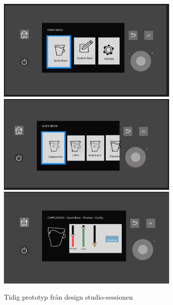 \begin{figure}[H]
    \centering
    \includegraphics[width=0.8\textwidth]{bilder/victor1.png}
    \includegraphics[width=0.8\textwidth]{bilder/victor2.png}
    \includegraphics[width=0.8\textwidth]{bilder/victor3.png}
    \caption{Tidig prototyp från design studio-sessionen}
    \label{fig:tidiga_2}
\end{figure}

